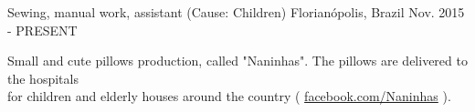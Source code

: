 

\begin{cventries}

  \cventry
    {Sewing, manual work, assistant (Cause: Children)} %
    {} %
    {Florianópolis, Brazil} %
    {Nov. 2015 - PRESENT} %
    {
      \begin{cvitems} %
        \item {Small and cute pillows production, called "Naninhas". The pillows are delivered to the hospitals \\
	for children and elderly houses around the country ( \href{https://www.facebook.com/Naninhasdobemflorianopolis/}{facebook.com/Naninhas} ).}
      \end{cvitems}
    }

\end{cventries}
